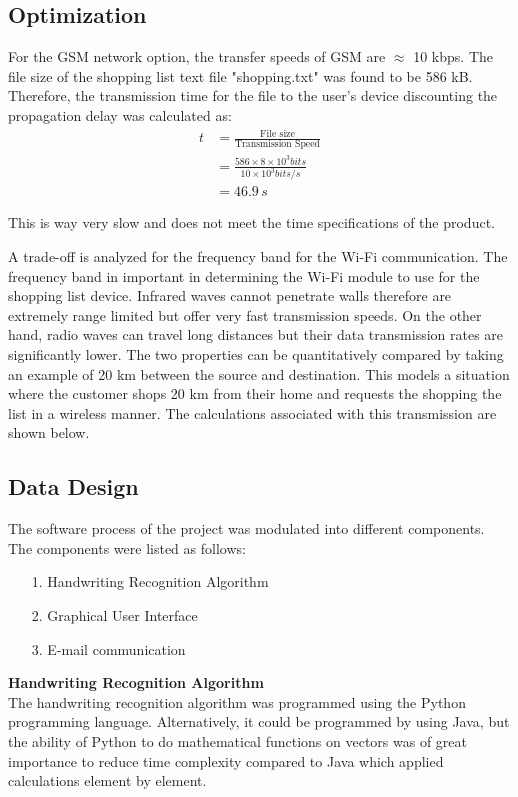 \subsection{Optimization}
For the GSM network option, the transfer speeds of GSM are $\approx$ 10 kbps. The file size of the shopping list text file "shopping.txt" was found to be 586 kB. Therefore, the transmission time for the file to the user's device discounting the propagation delay was calculated as:
\begin{align*}
	t &= \frac{\text{File size}}{\text{Transmission Speed}}\\
	&= \frac{586 \times 8 \times 10^3 bits}{10 \times 10^3 bits/s}\\
	&= 46.9\,s
\end{align*}

This is way very slow and does not meet the time specifications of the product.

A trade-off is analyzed for the frequency band for the Wi-Fi communication. The frequency band in important in determining the Wi-Fi module to use for the shopping list device. Infrared waves cannot penetrate walls therefore are extremely range limited but offer very fast transmission speeds. On the other hand, radio waves can travel long distances but their data transmission rates are significantly lower. The two properties can be quantitatively compared by taking an example of 20 km between the source and destination. This models a situation where the customer shops 20 km from their home and requests the shopping the list in a wireless manner. The calculations associated with this transmission are shown below.\\

\subsection{Data Design}
The software process of the project was modulated into different components. The components were listed as follows:
\begin{itemize}
	\item[1.]	Handwriting Recognition Algorithm
	\item[2.]	Graphical User Interface
	\item[3.]	E-mail communication
\end{itemize}

\textbf{Handwriting Recognition Algorithm}\\
The handwriting recognition algorithm was programmed using the Python programming language. Alternatively, it could be programmed by using Java, but the ability of Python to do mathematical functions on vectors was of great importance to reduce time complexity compared to Java which applied calculations element by element.

